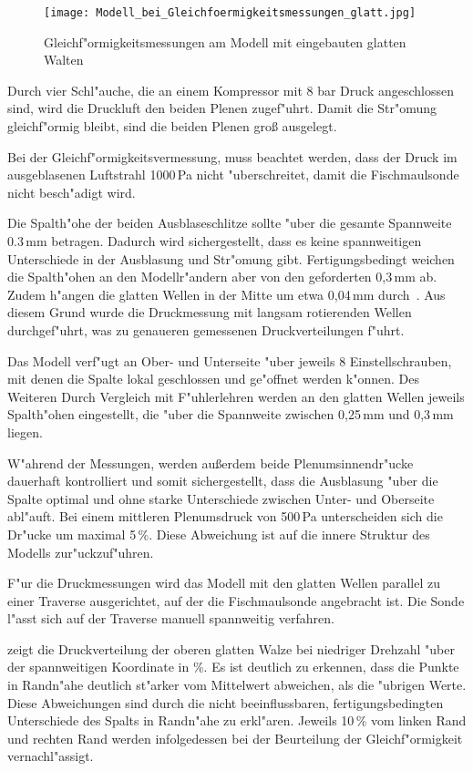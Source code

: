 \begin{figure}[h]
	\centering
	\texttt{[image: Modell\_bei\_Gleichfoermigkeitsmessungen\_glatt.jpg]}
	\caption{Gleichf"ormigkeitsmessungen am Modell mit eingebauten glatten Walten}
	\label{fig:Modell_bei_Gleichf"ormigkeitsmessungen}
\end{figure}

Durch vier Schl"auche, die an einem Kompressor mit 8 bar Druck angeschlossen sind, wird die Druckluft den beiden Plenen zugef"uhrt. Damit die Str"omung gleichf"ormig bleibt, sind die beiden Plenen gro\ss{} ausgelegt. 

Bei der Gleichf"ormigkeitsvermessung, muss beachtet werden, dass der Druck im ausgeblasenen Luftstrahl 1000\,Pa nicht "uberschreitet, damit die Fischmaulsonde nicht besch"adigt wird.

Die Spalth"ohe der beiden Ausblaseschlitze sollte "uber die gesamte Spannweite 0.3\,mm betragen. Dadurch wird sichergestellt, dass es keine spannweitigen Unterschiede in der Ausblasung und Str"omung gibt.
Fertigungsbedingt weichen die Spalth"ohen an den Modellr"andern aber von den geforderten 0,3\,mm ab. Zudem h"angen die glatten Wellen in der Mitte um etwa 0,04\,mm durch~\cite{Bilges.2018}. Aus diesem Grund wurde die Druckmessung mit langsam rotierenden Wellen durchgef"uhrt, was zu genaueren gemessenen Druckverteilungen f"uhrt.

Das Modell verf"ugt an Ober- und Unterseite "uber jeweils 8 Einstellschrauben, mit denen die Spalte lokal geschlossen und ge"offnet werden k"onnen. Des Weiteren 
Durch Vergleich mit F"uhlerlehren werden an den glatten Wellen jeweils Spalth"ohen eingestellt, die "uber die Spannweite zwischen 0,25\,mm und 0,3\,mm liegen.

W"ahrend der Messungen, werden au\ss{}erdem beide Plenumsinnendr"ucke dauerhaft kontrolliert und somit sichergestellt, dass die Ausblasung "uber die Spalte optimal und ohne starke Unterschiede zwischen Unter- und Oberseite abl"auft.
Bei einem mittleren Plenumsdruck von 500\,Pa unterscheiden sich die Dr"ucke um maximal 5\,\%. Diese Abweichung ist auf die innere Struktur des Modells zur"uckzuf"uhren.

F"ur die Druckmessungen wird das Modell mit den glatten Wellen parallel zu einer Traverse ausgerichtet, auf der die Fischmaulsonde angebracht ist. Die Sonde l"asst sich auf der Traverse manuell spannweitig verfahren. 

 zeigt die Druckverteilung der oberen glatten Walze bei niedriger Drehzahl "uber der spannweitigen Koordinate in \%. Es ist deutlich zu erkennen, dass die Punkte in Randn"ahe deutlich st"arker vom Mittelwert abweichen, als die "ubrigen Werte. Diese Abweichungen sind durch die nicht beeinflussbaren, fertigungsbedingten Unterschiede des Spalts in Randn"ahe zu erkl"aren.
Jeweils 10\,\% vom linken Rand und rechten Rand werden infolgedessen bei der Beurteilung der Gleichf"ormigkeit vernachl"assigt.

